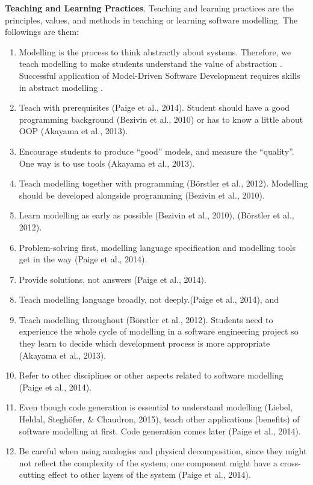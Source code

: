 \documentclass[a4paper]{Report}
\begin{document}
\textbf{Teaching and Learning Practices}. Teaching and learning practices are the principles, values, and methods in teaching or learning software modelling. The followings are them:
\begin{enumerate}
\item Modelling is the process to think abstractly about systems. Therefore, we teach modelling to make students understand the value of abstraction \cite{bezivin2009teaching}. Successful application of Model-Driven Software Development requires skills in abstract modelling \cite{whittle2013industrial}.
\item Teach with prerequisites (Paige et al., 2014). Student should have a good programming background (Bezivin et al., 2010) or has to know a little about OOP (Akayama et al., 2013).
\item Encourage students to produce “good” models, and measure the “quality”. One way is to use tools (Akayama et al., 2013).
\item Teach modelling together with programming (Börstler et al., 2012). Modelling should be developed alongside programming (Bezivin et al., 2010).
\item Learn modelling as early as possible (Bezivin et al., 2010), (Börstler et al., 2012).
\item Problem-solving first, modelling language specification and modelling tools get in the way (Paige et al., 2014).
\item Provide solutions, not answers (Paige et al., 2014).
\item Teach modelling language broadly, not deeply.(Paige et al., 2014), and 
\item Teach modelling throughout (Börstler et al., 2012). Students need to experience the whole cycle of modelling in a software engineering project so they learn to decide which development process is more appropriate (Akayama et al., 2013).
\item Refer to other disciplines or other aspects related to software modelling (Paige et al., 2014).
\item Even though code generation is essential to understand modelling (Liebel, Heldal, Steghöfer, \& Chaudron, 2015),  teach other applications (benefits) of software modelling at first. Code generation comes later (Paige et al., 2014).
\item Be careful when using analogies and physical decomposition, since they might not reflect the complexity of the system; one component might have a cross-cutting effect to other layers of the system (Paige et al., 2014). 

\end{enumerate}
\end{document}

